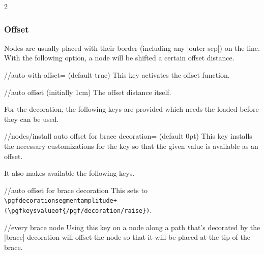 \begin{multicols*}{2}
\subsubsection{Offset}
Nodes are usually placed with their border (including any |outer sep|)
on the line.
With the following option, a node will be shifted a certain offset distance.

\begin{key}{/\tikzext/auto with offset= (default true)}
  This key activates the offset function.
\end{key}
\begin{key}{/\tikzext/auto offset (initially 1cm)}
The offset distance itself.
\end{key}

For the  decoration,
the following keys are provided which needs the
 loaded before they
can be used.
\begin{key}{/\tikzext/nodes/install auto offset for brace decoration= (default 0pt)}
This key installs the necessary customizations
for the  key
so that the given value is available as an offset.

It also makes available the following keys.
\begin{key}{/\tikzext/auto offset for brace decoration}
This sets  to
\texttt{\textbackslash pgfdecorationsegmentamplitude+
  (\textbackslash pgfkeysvalueof\{/pgf/decoration/raise\})}.
\end{key}
\begin{stylekey}{/\tikzext/every brace node}
Using this key on a node along a path that's decorated by the |brace| decoration
will offset the node so that it will be placed at the tip of the brace.
\end{stylekey}
\begin{codeexample}[preamble=\usetikzlibrary{decorations.pathreplacing, ext.nodes},width=3.75cm]
\end{codeexample}
\end{key}


\end{multicols*}
